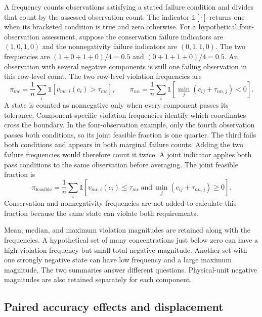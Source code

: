 A frequency counts observations satisfying a stated failure condition and divides that count by the assessed observation count. The indicator $\mathbb{1}[\cdot]$ returns one when its bracketed condition is true and zero otherwise. For a hypothetical four-observation assessment, suppose the conservation failure indicators are $(1,0,1,0)$ and the nonnegativity failure indicators are $(0,1,1,0)$. The two frequencies are $(1+0+1+0)/4=0.5$ and $(0+1+1+0)/4=0.5$. An observation with several negative components is still one failing observation in this row-level count. The two row-level violation frequencies are
\begin{equation}
\pi_{mc}=
\frac{1}{n}\sum_i\mathbb{1}[v_{mc,i}(c_i)>\tau_{mc}],\qquad
\pi_{nn}=
\frac{1}{n}\sum_i\mathbb{1}[\min_j(c_{ij}+\tau_{nn,j})<0].
\label{eq:projection_violation_rates}
\end{equation}
A state is counted as nonnegative only when every component passes its tolerance. Component-specific violation frequencies identify which coordinates cross the boundary. In the four-observation example, only the fourth observation passes both conditions, so its joint feasible fraction is one quarter. The third fails both conditions and appears in both marginal failure counts. Adding the two failure frequencies would therefore count it twice. A joint indicator applies both pass conditions to the same observation before averaging. The joint feasible fraction is
\begin{equation}
\pi_{\mathrm{feasible}}=
\frac{1}{n}\sum_i\mathbb{1}
[v_{mc,i}(c_i)\leq\tau_{mc}\ \text{and}\ 
\min_j(c_{ij}+\tau_{nn,j})\geq0].
\label{eq:projection_feasible_fraction}
\end{equation}
Conservation and nonnegativity frequencies are not added to calculate this fraction because the same state can violate both requirements.

Mean, median, and maximum violation magnitudes are retained along with the frequencies. A hypothetical set of many concentrations just below zero can have a high violation frequency but small total negative magnitude. Another set with one strongly negative state can have low frequency and a large maximum magnitude. The two summaries answer different questions. Physical-unit negative magnitudes are also retained separately for each component.

\subsection{Paired accuracy effects and displacement}

